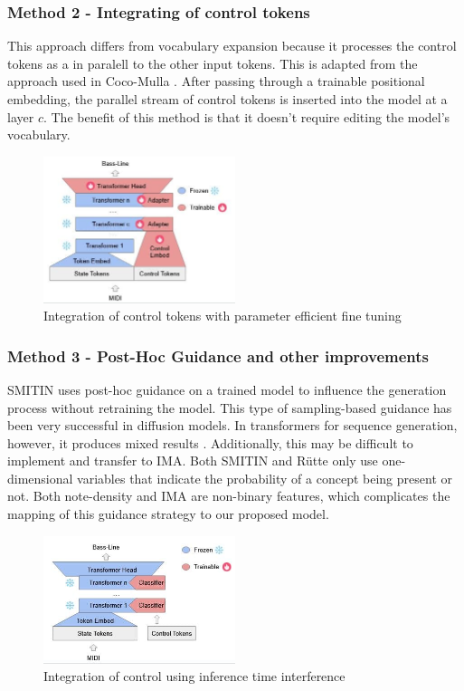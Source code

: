 \subsubsection{Method 2 - Integrating of control tokens} 

This approach differs from vocabulary expansion because it processes the control tokens as a in paralell to the other input tokens. This is adapted from the approach used in Coco-Mulla \cite{Lin_cocomulla_2024}. After passing through a trainable positional embedding, the parallel stream of control tokens is inserted into the model at a layer $c$. The benefit of this method is that it doesn't require editing the model's vocabulary. 

\begin{figure}[H]
\centering
\includegraphics[width=0.5\textwidth]{IMAGES/ControlTokensLora.jpg} 
\caption{Integration of control tokens with parameter efficient fine tuning}
\label{fig:controltok}
\end{figure}

\subsubsection{Method 3 - Post-Hoc Guidance and other improvements}

SMITIN\cite{Koo_Wichern_Germain_SMITIN_2024} uses post-hoc guidance on a trained model to influence the generation process without retraining the model. This type of sampling-based guidance has been very successful in diffusion models. In transformers for sequence generation, however, it produces mixed results \cite{language_guide_rutte_2024}. Additionally, this may be difficult to implement and transfer to IMA. Both SMITIN and Rütte\cite{language_guide_rutte_2024} only use one-dimensional variables that indicate the probability of a concept being present or not. Both note-density and IMA are non-binary features, which complicates the mapping of this guidance strategy to our proposed model. 

\begin{figure}[H]
\centering
\includegraphics[width=0.5\textwidth]{IMAGES/adhoccontrol.jpg} 
\caption{Integration of control using inference time interference}
\label{fig:adhoccontrol}
\end{figure}

